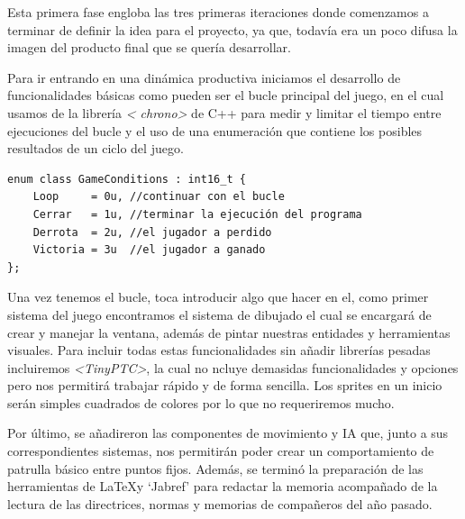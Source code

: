 \newpage

Esta primera fase engloba las tres primeras iteraciones donde comenzamos a terminar de definir 
la idea para el proyecto, ya que, todavía era un poco difusa la imagen del producto final que se
quería desarrollar.

Para ir entrando en una dinámica productiva iniciamos el desarrollo de funcionalidades básicas 
como pueden ser el bucle principal del juego, en el cual usamos de la librería \textit{\textless
chrono\textgreater} de C++ para medir y limitar el tiempo entre ejecuciones del bucle y el uso 
de una enumeración que contiene los posibles resultados de un ciclo del juego.

\begin{lstlisting}[style=CodigoC++, caption={Resultados iteración bucle},label=game_conditions]
enum class GameConditions : int16_t {
	Loop     = 0u, //continuar con el bucle
	Cerrar   = 1u, //terminar la ejecución del programa
	Derrota  = 2u, //el jugador a perdido
	Victoria = 3u  //el jugador a ganado
};
\end{lstlisting}

Una vez tenemos el bucle, toca introducir algo que hacer en el, como primer sistema del juego
encontramos el sistema de dibujado el cual se encargará de crear y manejar la ventana, además
de pintar nuestras entidades y herramientas visuales. Para incluir todas estas funcionalidades
sin añadir librerías pesadas incluiremos \textit{\textless TinyPTC\textgreater}, la cual no 
ncluye demasidas funcionalidades y opciones pero nos permitirá trabajar rápido y de forma 
sencilla. Los sprites en un inicio serán simples cuadrados de colores por lo que no requeriremos 
mucho.

Por último, se añadireron las componentes de movimiento y \ac{IA} que, junto a sus correspondientes
sistemas, nos permitirán poder crear un comportamiento de patrulla básico entre puntos fijos.
Además, se terminó la preparación de las herramientas de \LaTeX y `Jabref' para redactar la 
memoria acompañado de la lectura de las directrices, normas y memorias de compañeros del año 
pasado.

